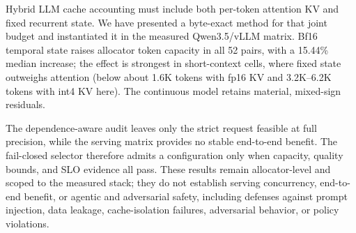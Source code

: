 \documentclass[conference,letterpaper,10pt]{IEEEtran}
\begin{document}
Hybrid LLM cache accounting must include both per-token attention KV and fixed
recurrent state. We have presented a byte-exact method for that joint budget
and instantiated it in the measured Qwen3.5/vLLM matrix. Bf16 temporal state
raises allocator token capacity in all 52 pairs, with a 15.44\% median increase;
the effect is strongest in short-context cells, where fixed state outweighs
attention (below about 1.6K tokens with fp16 KV and 3.2K--6.2K tokens with
int4 KV here). The continuous model retains material, mixed-sign residuals.

The dependence-aware audit leaves only the strict request feasible at full
precision, while the serving matrix provides no stable end-to-end benefit. The
fail-closed selector therefore admits a configuration only when capacity,
quality bounds, and SLO evidence all pass. These results remain allocator-level
and scoped to the measured stack; they do not establish serving concurrency,
end-to-end benefit, or agentic and adversarial safety, including defenses
against prompt injection, data leakage, cache-isolation failures, adversarial
behavior, or policy violations.



\end{document}
